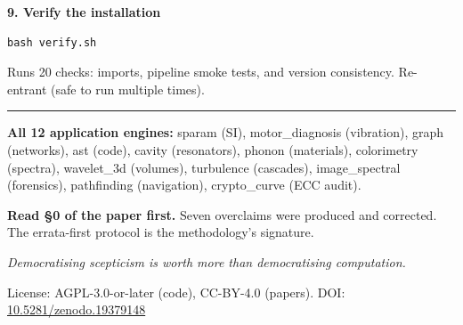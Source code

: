 \documentclass[10pt]{article}
\begin{document}
\vspace{4pt}
\noindent\textbf{9. Verify the installation}
\begin{Verbatim}[fontsize=\small, frame=single]
bash verify.sh
\end{Verbatim}
Runs 20 checks: imports, pipeline smoke tests, and version consistency.
Re-entrant (safe to run multiple times).

\vspace{8pt}
\hrule
\vspace{6pt}

\noindent\textbf{All 12 application engines:}
sparam (SI), motor\_diagnosis (vibration), graph (networks),
ast (code), cavity (resonators), phonon (materials),
colorimetry (spectra), wavelet\_3d (volumes), turbulence (cascades),
image\_spectral (forensics), pathfinding (navigation),
crypto\_curve (ECC audit).

\vspace{4pt}
\noindent\textbf{Read \S0 of the paper first.}
Seven overclaims were produced and corrected. The errata-first protocol is
the methodology's signature.

\vspace{4pt}
\noindent\emph{Democratising scepticism is worth more than democratising computation.}

\vspace{4pt}
\noindent
License: AGPL-3.0-or-later (code), CC-BY-4.0 (papers).
DOI: \href{https://doi.org/10.5281/zenodo.19379148}{10.5281/zenodo.19379148}
\end{document}
